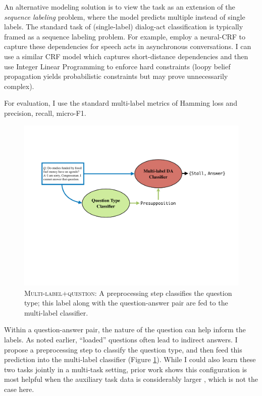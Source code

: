 An alternative modeling solution is to view the task as an extension of the \emph{sequence labeling} problem, where the model predicts multiple instead of single labels. The standard task of (single-label) dialog-act classification is typically framed as a sequence labeling problem. For example, \citet{Joty:2018} employ a neural-CRF to capture these dependencies for speech acts in asynchronous conversations. I can use a similar CRF model which captures short-distance dependencies and then use Integer Linear Programming to enforce hard constraints (loopy belief propagation yields probabilistic constraints but may prove unnecessarily complex). 


For evaluation, I use the standard multi-label metrics of Hamming loss and precision, recall, micro-F1.

\begin{figure}
\centering
\includegraphics[width=\columnwidth]{plots/multilabel_question.pdf}
\caption{\textsc{Multi-label+question}: A preprocessing step classifies the question type; this label along with the question-answer pair are fed to the multi-label classifier.}
\label{fig:multilabel_question}
\vspace{-1em}
\end{figure}

 Within a question-answer pair, the nature of the question can help inform the labels. As noted earlier, ``loaded'' questions often lead to indirect answers. I propose a preprocessing step to classify the question type, and then feed this prediction into the multi-label classifier (Figure \ref{fig:multilabel_question}). While I could also learn these two tasks jointly in a multi-task setting, prior work shows this configuration is most helpful when the auxiliary task data is considerably larger \citet{Luong:2015}, which is not the case here. 

